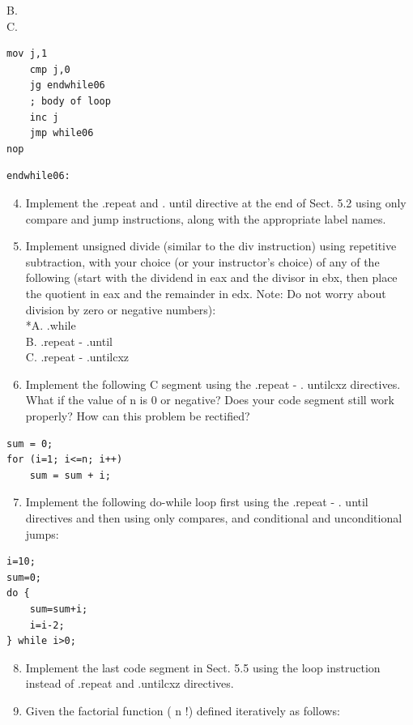 \documentclass[10pt]{article}
\begin{document}
B.\\
C.

\begin{verbatim}
mov j,1
    cmp j,0
    jg endwhile06
    ; body of loop
    inc j
    jmp while06
nop
\end{verbatim}

\begin{verbatim}
endwhile06:
\end{verbatim}

\begin{enumerate}
  \setcounter{enumi}{3}
  \item Implement the .repeat and . until directive at the end of Sect. 5.2 using only compare and jump instructions, along with the appropriate label names.
  \item Implement unsigned divide (similar to the div instruction) using repetitive subtraction, with your choice (or your instructor's choice) of any of the following (start with the dividend in eax and the divisor in ebx, then place the quotient in eax and the remainder in edx. Note: Do not worry about division by zero or negative numbers):\\
*A. .while\\
B. .repeat - .until\\
C. .repeat - .untilcxz
  \item Implement the following C segment using the .repeat - . untilcxz directives. What if the value of n is 0 or negative? Does your code segment still work properly? How can this problem be rectified?
\end{enumerate}

\begin{verbatim}
sum = 0;
for (i=1; i<=n; i++)
    sum = sum + i;
\end{verbatim}

\begin{enumerate}
  \setcounter{enumi}{6}
  \item Implement the following do-while loop first using the .repeat - . until directives and then using only compares, and conditional and unconditional jumps:
\end{enumerate}

\begin{verbatim}
i=10;
sum=0;
do {
    sum=sum+i;
    i=i-2;
} while i>0;
\end{verbatim}

\begin{enumerate}
  \setcounter{enumi}{7}
  \item Implement the last code segment in Sect. 5.5 using the loop instruction instead of .repeat and .untilcxz directives.
  \item Given the factorial function ( n !) defined iteratively as follows:
\end{enumerate}
\end{document}
